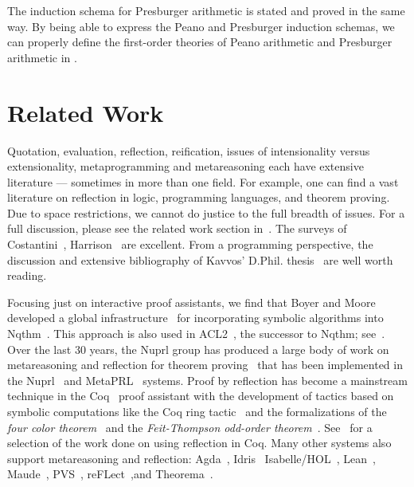 \documentclass[fleqn]{llncs}
\begin{document}
\ee 
\esp 

\noindent 
The induction schema for Presburger arithmetic is stated and proved in
the same way.  By being able to express the Peano and Presburger induction
schemas, we can properly define the first-order theories of Peano
arithmetic and Presburger arithmetic in {\HLQE}.

\section{Related Work}\label{sec:related-work}

Quotation, evaluation, reflection, reification, issues of
intensionality versus extensionality, metaprogramming and
metareasoning each have extensive literature --- sometimes
in more than one field.  For example, one can find a
vast literature on reflection in logic, programming languages,
and theorem proving. Due to space restrictions, we cannot
do justice to the full breadth of issues. For a full discussion,
please see the related work section in~\cite{Farmer18}.
The surveys of Costantini~\cite{Costantini02},
Harrison~\cite{Harrison95} are excellent. From a
programming perspective, the discussion and extensive 
bibliography of Kavvos' D.Phil. thesis~\cite{Kavvos2017}
are well worth reading.

Focusing just on interactive proof assistants, we find
that Boyer and Moore developed a global
infrastructure~\cite{BoyerMoore81} for
incorporating symbolic algorithms into Nqthm~\cite{BoyerMoore88}.
This approach is also used in
ACL2~\cite{KaufmannMoore97}, the successor to Nqthm;
see~\cite{HuntEtAl05}.  Over the last 30 years, the Nuprl group
has produced a large body of work on metareasoning
and reflection for theorem
proving~\cite{AllenEtAl90,Barzilay05,Constable95,Howe92,KnoblockConstable86,Nogin05,Yu07}
that has been implemented in the Nuprl~\cite{Constable86} and
MetaPRL~\cite{HickeyEtAl03} systems.  Proof by reflection has become a
mainstream technique in the Coq~\cite{Coq8.5} proof assistant with the
development of tactics based on symbolic computations like the Coq
ring tactic~\cite{Boutin97,GregoireMahboubi05} and the formalizations
of the \emph{four color theorem}~\cite{Gonthier08} and the
\emph{Feit-Thompson odd-order theorem}~\cite{GonthierEtAl13}.
See~\cite{Boutin97,BraibantPous11,Chlipala13,gonthier2010introduction,GregoireMahboubi05,JamesHinze09,OostdijkGeuvers02}
for a selection of the work done on using reflection in Coq.
Many other systems also support metareasoning and reflection:
Agda~\cite{Norell09,VanDerWalt12,VanDerWaltSwierstra12},
Idris~\cite{Christiansen:2014,Christiansen:2016,Christiansen:2016:Thesis}
Isabelle/HOL~\cite{ChaiebNipkow08},
Lean~\cite{ebner2017metaprogramming},
Maude~\cite{ClavelMeseguer02}, 
PVS~\cite{VonHenkeEtAl98}, 
reFLect~\cite{GrundyEtAl06,MelhamEtAl13},and
Theorema~\cite{BuchbergerEtAl06,GieseBuchberger07}.
\end{document}
